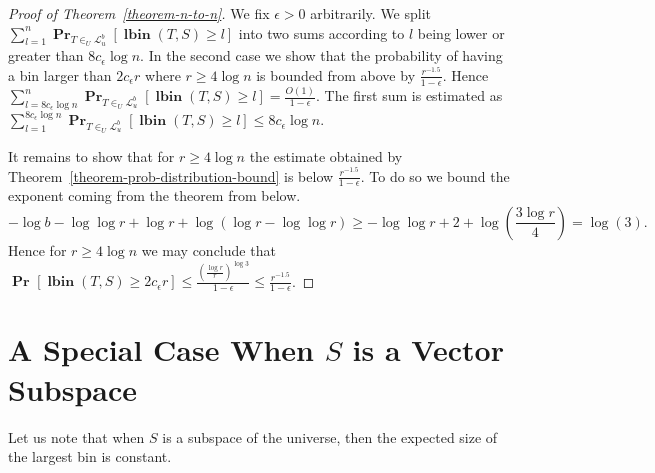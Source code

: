 \documentclass{article}
\newcommand{\lbin}[2]{\operatorname{\mathbf{lbin}}({#1}, {#2})}
\newcommand{\linearmaps}[2]{\mathcal{L}_{#1}^{#2}}
\newcommand{\probs}[2]{\operatorname{\mathbf{Pr}}_{{#1}}\left[{#2}\right]}
\newcommand{\prob}[1]{\probs{}{#1}}
\begin{document}
\begin{proof}[Proof of Theorem~\ref{theorem-n-to-n}]
We fix $\epsilon > 0$ arbitrarily.
We split $\sum_{l = 1}^{n} \probs{T\in_U\linearmaps{u}{b}}{\lbin{T}{S} \geq l}$ into two sums according to $l$ being lower or greater than $8c_\epsilon \log n$.
In the second case we show that the probability of having a bin larger than $2 c_\epsilon r$ where $r \geq 4\log n$ is bounded from above by $\frac{r^{-1.5}}{1-\epsilon}$.
Hence $\sum_{l = 8c_\epsilon \log n}^{n} \probs{T\in_U\linearmaps{u}{b}}{\lbin{T}{S} \geq l} = \frac{O(1)}{1-\epsilon}$.
The first sum is estimated as $\sum_{l = 1}^{8c_\epsilon \log n} \probs{T\in_U\linearmaps{u}{b}}{\lbin{T}{S} \geq l} \leq 8c_\epsilon \log n$.

It remains to show that for $r \geq 4 \log n$ the estimate obtained by Theorem~\ref{theorem-prob-distribution-bound} is below $\frac{r^{-1.5}}{1-\epsilon}$.
To do so we bound the exponent coming from the theorem from below.
\[
-\log b - \log \log r + \log r + \log (\log r - \log \log r) \geq -\log \log r + 2 + \log \left(\frac{3\log r}{4}\right) = \log(3).
\]
Hence for $r \geq 4\log n$ we may conclude that $\prob{\lbin{T}{S} \geq 2c_\epsilon r} \leq \frac{\left(\frac{\log r}{r}\right)^{\log 3}}{1-\epsilon} \leq \frac{r^{-1.5}}{1-\epsilon}$.
\end{proof}

\section{A Special Case When $S$ is a Vector Subspace}

Let us note that when $S$ is a subspace of the universe, then the expected size of the largest bin is constant.
\end{document}
